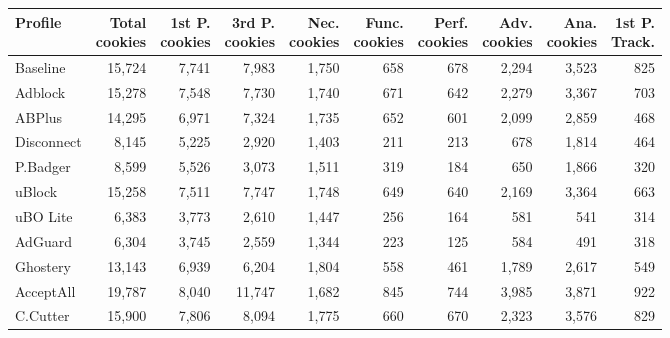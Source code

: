 \begin{table}[H]
    \label{tab:cookie-summary}
    \footnotesize
    \begin{tabular}{lrrrrrrrrr}
    \toprule
    \textbf{\scriptsize Profile} & \shortstack{ \textbf{\scriptsize Total}\\\textbf{\scriptsize cookies}} & \shortstack{\textbf{\scriptsize 1st P.}\\\textbf{\scriptsize cookies}} & \shortstack{\textbf{\scriptsize 3rd P.}\\\textbf{\scriptsize cookies}} & \shortstack{\textbf{\scriptsize Nec.}\\\textbf{\scriptsize cookies}} & \shortstack{\textbf{\scriptsize Func.}\\\textbf{\scriptsize cookies}} & \shortstack{\textbf{\scriptsize Perf.}\\\textbf{\scriptsize cookies}} & \shortstack{\textbf{\scriptsize Adv.}\\\textbf{\scriptsize cookies}} & \shortstack{\textbf{\scriptsize Ana.}\\\textbf{\scriptsize cookies}} & \shortstack{\textbf{\scriptsize 1st P.}\\\textbf{\scriptsize Track.}} \\
    \midrule
    Baseline & 15,724 & 7,741 & 7,983 & 1,750 & 658 & 678 & 2,294 & 3,523 & 825 \\
    Adblock & 15,278 & 7,548 & 7,730 & 1,740 & 671 & 642 & 2,279 & 3,367 & 703 \\
    ABPlus & 14,295 & 6,971 & 7,324 & 1,735 & 652 & 601 & 2,099 & 2,859 & 468 \\
    Disconnect & 8,145 & 5,225 & 2,920 & 1,403 & 211 & 213 & 678 & 1,814 & 464 \\
    P.Badger & 8,599 & 5,526 & 3,073 & 1,511 & 319 & 184 & 650 & 1,866 & 320 \\
    uBlock & 15,258 & 7,511 & 7,747 & 1,748 & 649 & 640 & 2,169 & 3,364 & 663 \\
    uBO Lite & 6,383 & 3,773 & 2,610 & 1,447 & 256 & 164 & 581 & 541 & 314 \\
    AdGuard & 6,304 & 3,745 & 2,559 & 1,344 & 223 & 125 & 584 & 491 & 318 \\
    Ghostery & 13,143 & 6,939 & 6,204 & 1,804 & 558 & 461 & 1,789 & 2,617 & 549 \\
    AcceptAll & 19,787 & 8,040 & 11,747 & 1,682 & 845 & 744 & 3,985 & 3,871 & 922 \\
    C.Cutter & 15,900 & 7,806 & 8,094 & 1,775 & 660 & 670 & 2,323 & 3,576 & 829 \\

\end{tabular}
\end{table}
